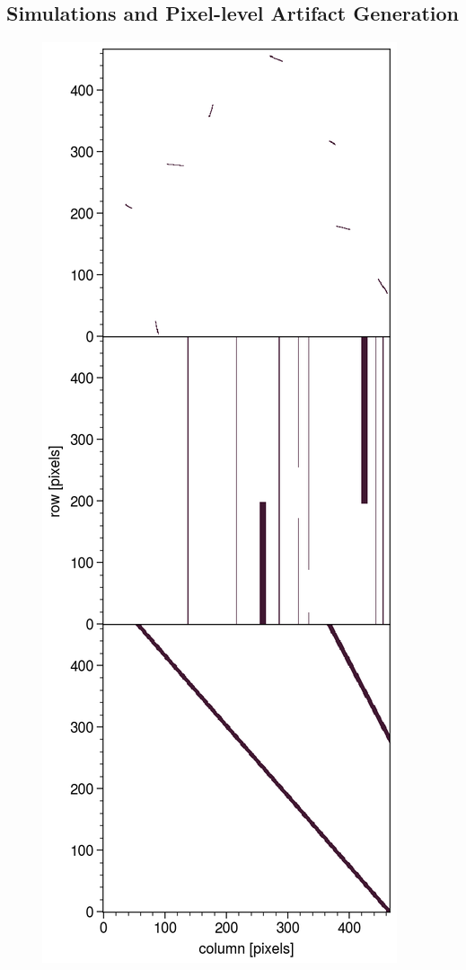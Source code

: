 \documentclass[twocolappendix, appendixfloats, numberedappendix, twocolumn, apj]{openjournal}
\begin{document}
\subsection{Simulations and Pixel-level Artifact Generation}

\begin{figure}
    \begin{center}
        \includegraphics[width=0.75\columnwidth]{masking.png}
        \caption{\label{fig:mcgen}}
    \end{center}
\end{figure}
\end{document}
